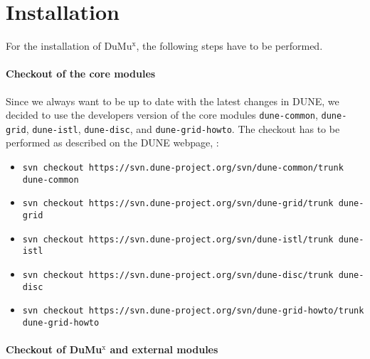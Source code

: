 \section{Installation} 

For the installation of DuMu$^\text{x}$, the following steps have to be performed.  

\paragraph{Checkout of the core modules}
Since we always want to be up to date with the latest changes in DUNE, 
we decided to use the developers version of the core modules 
\texttt{dune-common}, \texttt{dune-grid}, \texttt{dune-istl}, \texttt{dune-disc}, 
and \texttt{dune-grid-howto}. The checkout has to be performed as described on 
the DUNE webpage, \cite{DUNE-HP}: 
\begin{itemize}
\item \texttt{svn checkout https://svn.dune-project.org/svn/dune-common/trunk dune-common}
\item \texttt{svn checkout https://svn.dune-project.org/svn/dune-grid/trunk dune-grid}
\item \texttt{svn checkout https://svn.dune-project.org/svn/dune-istl/trunk dune-istl}
\item \texttt{svn checkout https://svn.dune-project.org/svn/dune-disc/trunk dune-disc}
\item \texttt{svn checkout https://svn.dune-project.org/svn/dune-grid-howto/trunk dune-grid-howto}
\end{itemize} 

\paragraph{Checkout of DuMu$^\text{x}$ and external modules} 

